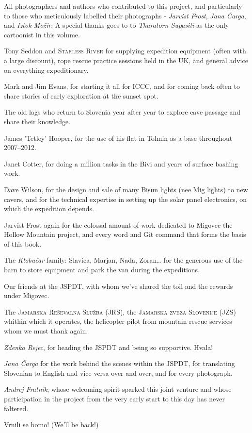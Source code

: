 \begin{citemize}
\item All photographers and authors who contributed to this project, and particularly to those who meticulously labelled their photographs - \textit{Jarvist Frost}, \textit{Jana Čarga}, and \textit{Iztok Možir}. A special thanks goes to to \textit{Tharatorn Supasiti} as the only cartoonist in this volume.

\item Tony Seddon and \textsc{Starless River} for supplying expedition equipment (often with a large discount), rope rescue practice sessions held in the UK, and general advice on everything expeditionary.

\item Mark and Jim Evans, for starting it all for ICCC, and for coming back often to share stories of early exploration at the sunset spot.
\item The old lags who return to Slovenia year after year to explore cave passage and share their knowledge.
\item James 'Tetley' Hooper, for the use of his flat in Tolmin as a base throughout 2007--2012.
\item Janet Cotter, for doing a million tasks in the Bivi and years of surface bashing work. 
\item Dave Wilson, for the design and sale of many Bisun lights (nee Mig lights) to new cavers, and for the technical expertise in setting up the solar panel electronics, on which the expedition depends.


\item Jarvist Frost again for the colossal amount of work dedicated to Migovec the Hollow Mountain project, and every word and Git command that forms the basis of this book. 


\item The \textit{Klobu\v{c}ar} family: Slavica, Marjan, Nada, Zoran\ldots{} for the generous use of the barn to store equipment and park the van during the expeditions.

\item Our friends at the JSPDT, with whom we've shared the toil and the rewards under Migovec.
\item The \textsc{Jamarska Re\v{s}evalna Slu\v{z}ba} (JRS), the \textsc{Jamarska zveza Slovenije} (JZS) whithin which it operates, the helicopter pilot from mountain rescue services whom we must thank again.
\item \textit{Zdenko Rejec}, for heading the JSPDT and being so supportive. Hvala!
\item \textit{Jana \v{C}arga} for the work behind the scenes within the JSPDT, for translating Slovenian to English and vice versa over and over, and for every photograph.
\item \textit{Andrej Fratnik}, whose welcoming spirit sparked this joint venture and whose participation in the project from the very early start to this day has never faltered. 
\end{citemize}


Vrnili se bomo! (We'll be back!)